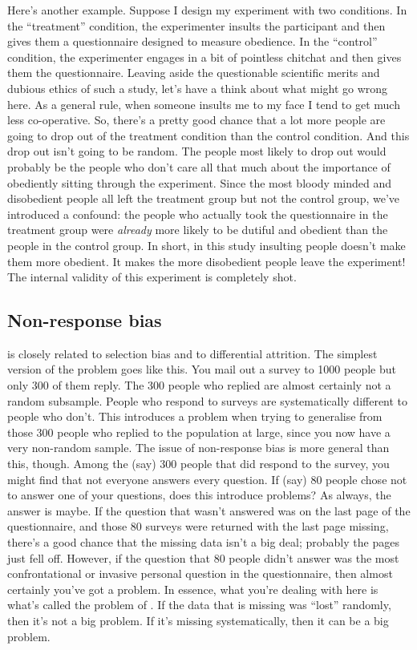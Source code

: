 Here's another example. Suppose I design my experiment with two conditions. In the ``treatment'' condition, the experimenter insults the participant and then gives them a questionnaire designed to measure obedience. In the ``control'' condition, the experimenter engages in a bit of pointless chitchat and then gives them the questionnaire. Leaving aside the questionable scientific merits and dubious ethics of such a study, let's have a think about what might go wrong here. As a general rule, when someone insults me to my face I tend to get much less co-operative. So, there's a pretty good chance that a lot more people are going to drop out of the treatment condition than the control condition. And this drop out isn't going to be random. The people most likely to drop out would probably be the people who don't care all that much about the importance of obediently sitting through the experiment. Since the most bloody minded and disobedient people all left the treatment group but not the control group, we've introduced a confound: the people who actually took the questionnaire in the treatment group were {\it already} more likely to be dutiful and obedient than the people in the control group. In short, in this study insulting people doesn't make them more obedient. It makes the more disobedient people leave the experiment! The internal validity of this experiment is completely shot. 

\subsection{Non-response bias}

 is closely related to selection bias and to differential attrition. The simplest version of the problem goes like this. You mail out a survey to 1000 people but only 300 of them reply. The 300 people who replied are almost certainly not a random subsample. People who respond to surveys are systematically different to people who don't. This introduces a problem when trying to generalise from those 300 people who replied to the population at large, since you now have a very non-random sample. The issue of non-response bias is more general than this, though. Among the (say) 300 people that did respond to the survey, you might find that not everyone answers every question. If (say) 80 people chose not to answer one of your questions, does this introduce problems? As always, the answer is maybe. If the question that wasn't answered was on the last page of the questionnaire, and those 80 surveys were returned with the last page missing, there's a good chance that the missing data isn't a big deal; probably the pages just fell off. However, if the question that 80 people didn't answer was the most confrontational or invasive personal question in the questionnaire, then almost certainly you've got a problem. In essence, what you're dealing with here is what's called the problem of . If the data that is missing was ``lost'' randomly, then it's not a big problem. If it's missing systematically, then it can be a big problem.

